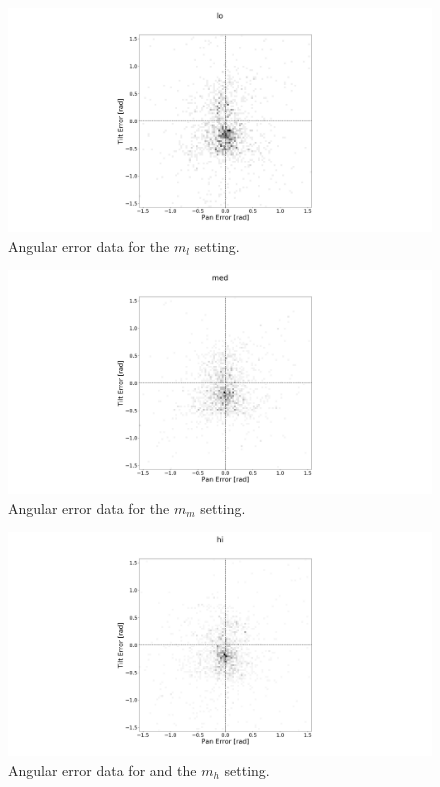 \documentclass[sigconf, screen=true, anonymous=true]{acmart}
\begin{document}
\begin{figure}
  \centering
  \includegraphics[clip, trim=450 0 450 110, width=0.8\columnwidth]{figures/err_lo.png}
  \caption{Angular error data for the $m_l$ setting. }\label{fig:err-results-lo}
\end{figure}

\begin{figure}
  \centering
  \includegraphics[clip, trim=450 0 450 110, width=0.8\columnwidth]{figures/err_med.png}
  \caption{Angular error data for the $m_m$ setting. }\label{fig:err-results-med}
\end{figure}

\begin{figure}
  \centering
  \includegraphics[clip, trim=450 0 450 110, width=0.8\columnwidth]{figures/err_hi.png}
  \caption{Angular error data for and the $m_h$ setting. }\label{fig:err-results-hi}
\end{figure}
\end{document}
